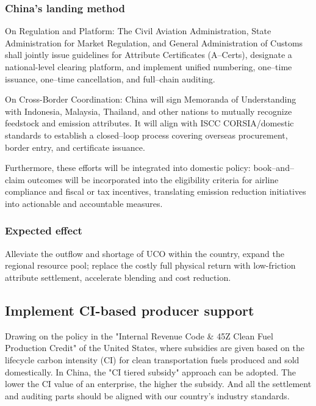 \documentclass[a4paper,11pt]{article}
\begin{document}
\subsubsection{China's landing method}
On Regulation and Platform: The Civil Aviation Administration, State Administration for Market Regulation, and General Administration of Customs shall jointly issue guidelines for Attribute Certificates (A--Certs), designate a national-level clearing platform, and implement unified numbering, one--time issuance, one--time cancellation, and full--chain auditing.

On Cross-Border Coordination: China will sign Memoranda of Understanding with Indonesia, Malaysia, Thailand, and other nations to mutually recognize feedstock and emission attributes. It will align with ISCC CORSIA/domestic standards to establish a closed--loop process covering overseas procurement, border entry, and certificate issuance.

Furthermore, these efforts will be integrated into domestic policy: book--and--claim outcomes will be incorporated into the eligibility criteria for airline compliance and fiscal or tax incentives, translating emission reduction initiatives into actionable and accountable measures.

\subsubsection{Expected effect}
Alleviate the outflow and shortage of UCO within the country, expand the regional resource pool; replace the costly full physical return with low-friction attribute settlement, accelerate blending and cost reduction.

\subsection{Implement CI-based producer support}
Drawing on the policy in the "Internal Revenue Code \& 45Z Clean Fuel Production Credit" of the United States, where subsidies are given based on the lifecycle carbon intensity (CI) for clean transportation fuels produced and sold domestically. In China, the "CI tiered subsidy" approach can be adopted. The lower the CI value of an enterprise, the higher the subsidy. And all the settlement and auditing parts should be aligned with our country's industry standards.
\end{document}
